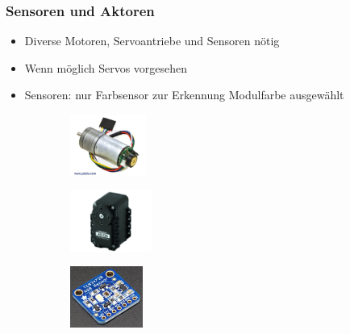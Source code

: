 \begin{frame}
	\frametitle{Sensoren und Aktoren}
	
	\begin{itemize}
		\item Diverse Motoren, Servoantriebe und Sensoren nötig
		\item Wenn möglich Servos vorgesehen %
		\item Sensoren: nur Farbsensor zur Erkennung Modulfarbe ausgewählt
	\end{itemize}   

	\begin{figure}
		\captionsetup[subfigure]{font=scriptsize,labelfont=scriptsize}
		\begin{subfigure}{0.2\textwidth}
			\centering
			\includegraphics[height=2cm] {../images/presentation/DCMotor.jpg}
		\end{subfigure}
		\hspace{1em}
		\begin{subfigure}{0.2\textwidth}
			\centering
			\includegraphics[height=2cm] {../images/presentation/IntServo.jpg}
		\end{subfigure}
		\hspace{1em}
		\begin{subfigure}{0.2\textwidth}
			\centering
			\includegraphics[height=2cm] {../images/presentation/RGB.jpg}
		\end{subfigure}
		\hspace{1em}
	\end{figure}
	
\end{frame}
